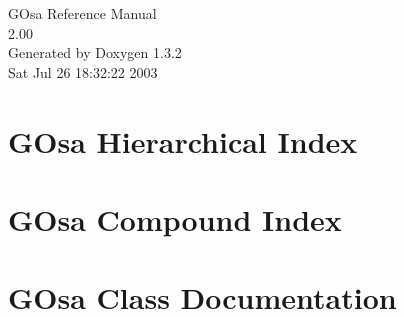 \documentclass[a4paper]{book}
\begin{document}
\begin{titlepage}
\vspace*{7cm}
\begin{center}
{\Large GOsa Reference Manual\\[1ex]\large 2.00 }\\
\vspace*{1cm}
{\large Generated by Doxygen 1.3.2}\\
\vspace*{0.5cm}
{\small Sat Jul 26 18:32:22 2003}\\
\end{center}
\end{titlepage}
\clearemptydoublepage
{}
\tableofcontents
\clearemptydoublepage
{}
\chapter{GOsa Hierarchical Index}

\chapter{GOsa Compound Index}

\chapter{GOsa Class Documentation}




\printindex
\end{document}
